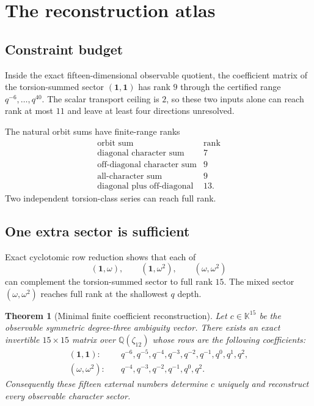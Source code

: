 \documentclass[11pt]{article}
\newtheorem{theorem}{Theorem}[section]
\theoremstyle{definition}
\theoremstyle{remark}
\newcommand{\Q}{\mathbb{Q}}
\newcommand{\K}{\mathbb{K}}
\begin{document}
\section{The reconstruction atlas}

\subsection{Constraint budget}

Inside the exact fifteen-dimensional observable quotient, the coefficient matrix of the torsion-summed sector $(\mathbf1,\mathbf1)$ has rank $9$ through the certified range $q^{-6},\ldots,q^{40}$.  The scalar transport ceiling is $2$, so these two inputs alone can reach rank at most $11$ and leave at least four directions unresolved.

The natural orbit sums have finite-range ranks
\[
\begin{array}{c|c}
\text{orbit sum}&\text{rank}\\
\hline
\text{diagonal character sum}&7\\
\text{off-diagonal character sum}&9\\
\text{all-character sum}&9\\
\text{diagonal plus off-diagonal}&13.
\end{array}
\]
Two independent torsion-class series can reach full rank.

\subsection{One extra sector is sufficient}

Exact cyclotomic row reduction shows that each of
\[
(\mathbf1,\omega),
\qquad
(\mathbf1,\omega^2),
\qquad
(\omega,\omega^2)
\]
can complement the torsion-summed sector to full rank $15$.  The mixed sector $(\omega,\omega^2)$ reaches full rank at the shallowest $q$ depth.

\begin{theorem}[Minimal finite coefficient reconstruction]\label{thm:atlas}
Let $c\in\K^{15}$ be the observable symmetric degree-three ambiguity vector.  There exists an exact invertible $15\times15$ matrix over $\Q(\zeta_{12})$ whose rows are the following coefficients:
\begin{align*}
(\mathbf1,\mathbf1):&\quad q^{-6},q^{-5},q^{-4},q^{-3},q^{-2},q^{-1},q^0,q^1,q^2,\\
(\omega,\omega^2):&\quad q^{-4},q^{-3},q^{-2},q^{-1},q^0,q^2.
\end{align*}
Consequently these fifteen external numbers determine $c$ uniquely and reconstruct every observable character sector.
\end{theorem}
\end{document}
